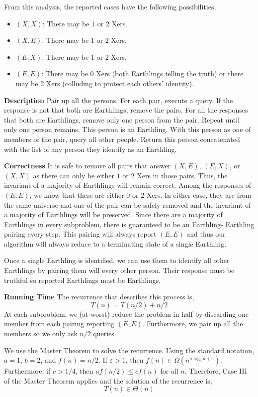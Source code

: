 \documentclass[12pt,twoside]{article}
\begin{document}
\begin{problems}
\begin{problemparts}
From this analysis, the reported cases have the following possibilities,
\begin{itemize}
    \item $(X, X)$: There may be 1 or 2 Xers. 
    \item $(X, E)$: There may be 1 or 2 Xers.
    \item $(E, X)$: There may be 1 or 2 Xers.
    \item $(E, E)$: There may be 0 Xers (both Earthlings telling the truth) or
    there may be 2 Xers (colluding to protect each others' identity).
\end{itemize}

\problempart %

\textbf{Description} Pair up all the persons. For each pair, execute a query. If
the response is not that both are Earthlings, remove the pairs. For all the
responses that both are Earthlings, remove only one person from the pair. Repeat
until only one person remains. This person is an Earthling. With this person as
one of members of the pair, query all other people. Return this person 
concatenated with the list of any person they identify as an Earthling.

\textbf{Correctness} It is safe to remove all pairs that answer $(X, E)$, $(E, X)$,
or $(X, X)$ as there can only be either $1$ or $2$ Xers in those pairs. Thus, the 
invariant of a majority of Earthlings will remain correct. Among the responses of 
$(E, E)$, we know that there are either $0$ or $2$ Xers. In either case, they 
are from the same universe and one of the pair can be safely removed and the 
invariant of a majority of Earthlings will be preserved. Since there are a
majority of Earthlings in every subproblem, there is guaranteed to be an Earthling-
Earthling pairing every step. This pairing will always report $(E, E)$ and thus
our algorithm will always reduce to a terminating state of a single Earthling.

Once a single Earthling is identified, we can use them to identify all other 
Earthlings by pairing them will every other person. Their response must be
truthful so reported Earthlings must be Earthlings.

\textbf{Running Time} The recurrence that describes this process is,
$$ T(n) = T(n / 2) + n / 2 $$
At each subproblem, we (at worst) reduce the problem in half by discarding one
member from each pairing reporting $(E, E)$. Furthermore, we pair up all the
members so we only ask $n / 2$ queries.

We use the Master Theorem to solve the recurrence. Using the standard notation,
$a = 1$, $b = 2$, and $f(n) = n / 2$. If $\varepsilon > 1$, then $f(n) \in 
\Omega(n^{a \log_b a + \varepsilon})$. Furthermore, if $c > 1/4$, then $a f(n/2) 
\leq c f(n)$ for all $n$. Therefore, Case III of the Master Theorem applies and 
the solution of the recurrence is,
$$ T(n) \in \Theta(n) $$


\end{problemparts}
\end{problems}
\end{document}
